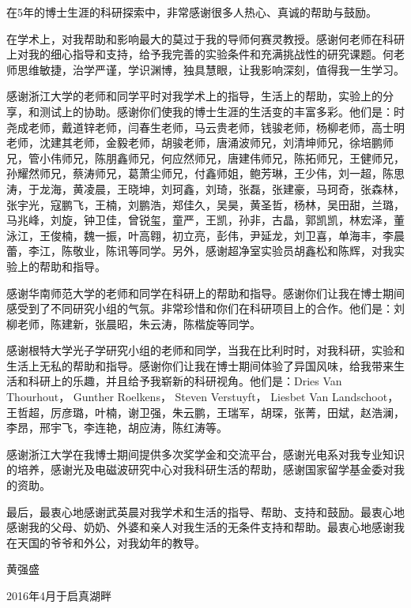 \begin{thanks}
	
在5年的博士生涯的科研探索中，非常感谢很多人热心、真诚的帮助与鼓励。

在学术上，对我帮助和影响最大的莫过于我的导师何赛灵教授。感谢何老师在科研上对我的细心指导和支持，给予我完善的实验条件和充满挑战性的研究课题。何老师思维敏捷，治学严谨，学识渊博，独具慧眼，让我影响深刻，值得我一生学习。

感谢浙江大学的老师和同学平时对我学术上的指导，生活上的帮助，实验上的分享，和测试上的协助。感谢你们使我的博士生涯的生活变的丰富多彩。他们是：时尧成老师，戴道锌老师，闫春生老师，马云贵老师，钱骏老师，杨柳老师，高士明老师，沈建其老师，金毅老师，胡骏老师，唐涌波师兄，刘清坤师兄，徐培鹏师兄，管小伟师兄，陈朋鑫师兄，何应然师兄，唐建伟师兄，陈拓师兄，王健师兄，孙耀然师兄，蔡涛师兄，葛萧尘师兄，付鑫师姐，鲍芳琳，王少伟，刘一超，陈思涛，于龙海，黄凌晨，王晓坤，刘珂鑫，刘琦，张磊，张建豪，马珂奇，张森林，张宇光，寇鹏飞，王楠，刘鹏浩，郑佳久，吴昊，黄圣哲，杨林，吴田甜，兰璐，马兆峰，刘旋，钟卫佳，曾锐玺，童严，王凯，孙非，古晶，郭凯凯，林宏泽，董泳江，王俊楠，魏一振，叶高翱，初立亮，彭伟，尹延龙，刘卫喜，单海丰，李晨蕾，李江，陈敬业，陈讯等同学。另外，感谢超净室实验员胡鑫松和陈辉，对我实验上的帮助和指导。

感谢华南师范大学的老师和同学在科研上的帮助和指导。感谢你们让我在博士期间感受到了不同研究小组的气氛。非常珍惜和你们在科研项目上的合作。他们是：刘柳老师，陈建新，张晨昭，朱云涛，陈楷旋等同学。

感谢根特大学光子学研究小组的老师和同学，当我在比利时时，对我科研，实验和生活上无私的帮助和指导。感谢你们让我在博士期间体验了异国风味，给我带来生活和科研上的乐趣，并且给予我崭新的科研视角。他们是：Dries Van Thourhout， Gunther Roelkens， Steven Verstuyft， Liesbet Van Landschoot， 王哲超，厉彦璐，叶楠，谢卫强，朱云鹏，王瑞军，胡琛，张菁，田斌，赵浩澜，李昂，邢宇飞，李连艳，胡应涛，陈红涛等。

感谢浙江大学在我博士期间提供多次奖学金和交流平台，感谢光电系对我专业知识的培养，感谢光及电磁波研究中心对我科研生活的帮助，感谢国家留学基金委对我的资助。

最后，最衷心地感谢武英晨对我学术和生活的指导、帮助、支持和鼓励。最衷心地感谢我的父母、奶奶、外婆和亲人对我生活的无条件支持和帮助。最衷心地感谢我在天国的爷爷和外公，对我幼年的教导。

\begin{flushright}
	黄强盛
	
	2016年4月于启真湖畔
\end{flushright}
\end{thanks}
